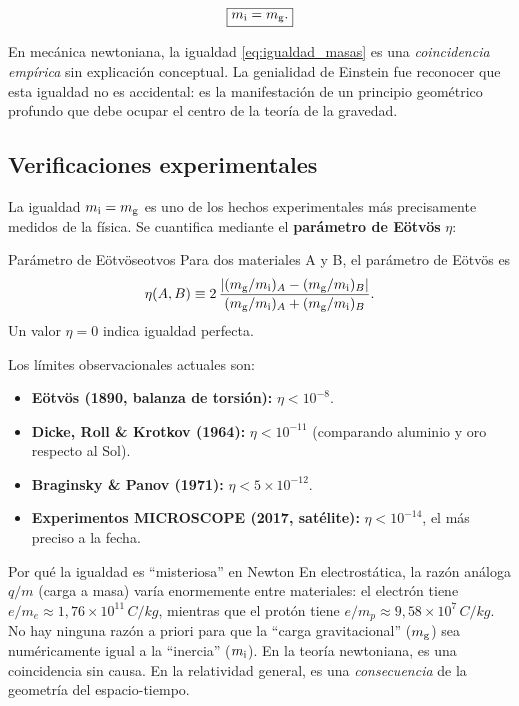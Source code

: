 \begin{equation}
  \boxed{m_{\rm i} = m_{\rm g}.}
  \label{eq:igualdad_masas}
\end{equation}

\begin{importante}
En mecánica newtoniana, la igualdad \eqref{eq:igualdad_masas} es una \emph{coincidencia empírica} sin explicación conceptual. La genialidad de Einstein fue reconocer que esta igualdad no es accidental: es la manifestación de un principio geométrico profundo que debe ocupar el centro de la teoría de la gravedad.
\end{importante}

\subsection{Verificaciones experimentales}

La igualdad $m_{\rm i} = m_{\rm g}$ es uno de los hechos experimentales más precisamente medidos de la física. Se cuantifica mediante el \textbf{parámetro de Eötvös} $\eta$:

\begin{definicion}{Parámetro de Eötvös}{eotvos}
Para dos materiales A y B, el parámetro de Eötvös es
\begin{equation}
  \eta(A,B) \equiv 2\,\frac{\left|(m_{\rm g}/m_{\rm i})_A - (m_{\rm g}/m_{\rm i})_B\right|}
                         {(m_{\rm g}/m_{\rm i})_A + (m_{\rm g}/m_{\rm i})_B}.
  \label{eq:eotvos}
\end{equation}
Un valor $\eta = 0$ indica igualdad perfecta.
\end{definicion}

Los límites observacionales actuales son:
\begin{itemize}[leftmargin=2em]
  \item \textbf{Eötvös (1890, balanza de torsión):} $\eta < 10^{-8}$.
  \item \textbf{Dicke, Roll \& Krotkov (1964):} $\eta < 10^{-11}$ (comparando aluminio y oro respecto al Sol).
  \item \textbf{Braginsky \& Panov (1971):} $\eta < 5\times10^{-12}$.
  \item \textbf{Experimentos MICROSCOPE (2017, satélite):} $\eta < 10^{-14}$, el más preciso a la fecha.
\end{itemize}

\begin{observacion}{Por qué la igualdad es ``misteriosa'' en Newton}{}
En electrostática, la razón análoga $q/m$ (carga a masa) varía enormemente entre materiales: el electrón tiene $e/m_e \approx 1{,}76\times10^{11}\,\si{C/kg}$, mientras que el protón tiene $e/m_p \approx 9{,}58\times10^7\,\si{C/kg}$. No hay ninguna razón a priori para que la ``carga gravitacional'' ($m_{\rm g}$) sea numéricamente igual a la ``inercia'' ($m_{\rm i}$). En la teoría newtoniana, es una coincidencia sin causa. En la relatividad general, es una \emph{consecuencia} de la geometría del espacio-tiempo.
\end{observacion}

